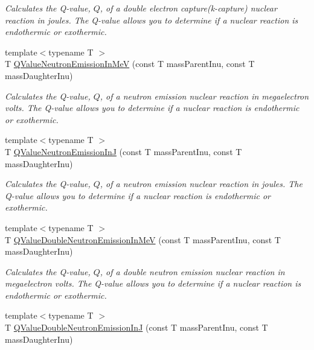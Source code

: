 \begin{DoxyCompactItemize}
\begin{DoxyCompactList}\small\item\em Calculates the Q-\/value, $Q$, of a double electron capture(k-\/capture) nuclear reaction in joules. The Q-\/value allows you to determine if a nuclear reaction is endothermic or exothermic. \end{DoxyCompactList}\item 
{\footnotesize template$<$typename T $>$ }\\T \mbox{\hyperlink{group___e_g_x_phys-_q_value-_neutron_emission_ga8ad6e53cb04260eb9b140e22b5b6d9f6}{Q\+Value\+Neutron\+Emission\+In\+MeV}} (const T mass\+Parent\+Inu, const T mass\+Daughter\+Inu)
\begin{DoxyCompactList}\small\item\em Calculates the Q-\/value, $Q$, of a neutron emission nuclear reaction in megaelectron volts. The Q-\/value allows you to determine if a nuclear reaction is endothermic or exothermic. \end{DoxyCompactList}\item 
{\footnotesize template$<$typename T $>$ }\\T \mbox{\hyperlink{group___e_g_x_phys-_q_value-_neutron_emission_gacb17fa06731637937bc65765943d67ca}{Q\+Value\+Neutron\+Emission\+InJ}} (const T mass\+Parent\+Inu, const T mass\+Daughter\+Inu)
\begin{DoxyCompactList}\small\item\em Calculates the Q-\/value, $Q$, of a neutron emission nuclear reaction in joules. The Q-\/value allows you to determine if a nuclear reaction is endothermic or exothermic. \end{DoxyCompactList}\item 
{\footnotesize template$<$typename T $>$ }\\T \mbox{\hyperlink{group___e_g_x_phys-_q_value-_neutron_emission_gaeafae8a98e46b701517c1a2b8bfc241d}{Q\+Value\+Double\+Neutron\+Emission\+In\+MeV}} (const T mass\+Parent\+Inu, const T mass\+Daughter\+Inu)
\begin{DoxyCompactList}\small\item\em Calculates the Q-\/value, $Q$, of a double neutron emission nuclear reaction in megaelectron volts. The Q-\/value allows you to determine if a nuclear reaction is endothermic or exothermic. \end{DoxyCompactList}\item 
{\footnotesize template$<$typename T $>$ }\\T \mbox{\hyperlink{group___e_g_x_phys-_q_value-_neutron_emission_gae8a2c7bd5c4facaea7615eccdfc47be1}{Q\+Value\+Double\+Neutron\+Emission\+InJ}} (const T mass\+Parent\+Inu, const T mass\+Daughter\+Inu)

\end{DoxyCompactItemize}

